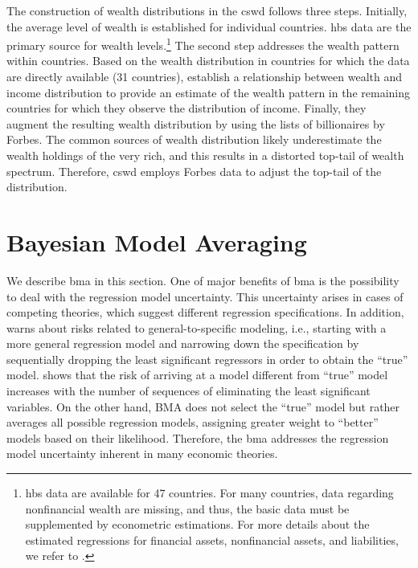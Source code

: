 \documentclass[a4paper,11pt]{article}
\begin{document}
The construction of wealth distributions in the \ac{cswd} follows three steps. Initially, the average level of wealth is established for individual countries. \ac{hbs} data are the primary source for wealth levels.\footnote{\ac{hbs} data are available for 47 countries. For many countries, data regarding nonfinancial wealth are missing, and thus, the basic data must be supplemented by econometric estimations. For more details about the estimated regressions for financial assets, nonfinancial assets, and liabilities, we refer to \citet{daviesetal2017}.} The second step addresses the wealth pattern within countries. Based on the wealth distribution in countries for which the data are directly available (31 countries), \citet{daviesetal2017} establish a relationship between wealth and income distribution to provide an estimate of the wealth pattern in the remaining countries for which they observe the distribution of income. Finally, they augment the resulting wealth distribution by using the lists of billionaires by Forbes. The common sources of wealth distribution likely underestimate the wealth holdings of the very rich, and this results in a distorted top-tail of wealth spectrum. Therefore, \ac{cswd} employs Forbes data to adjust the top-tail of the distribution. 

\section{Bayesian Model Averaging}
\label{sec:BMA}
We describe \ac{bma} in this section. %
One of major benefits of \ac{bma} is the possibility to deal with the regression model uncertainty. This uncertainty arises in cases of competing theories, which suggest different regression specifications. In addition, \citet{Koop2003} warns about risks related to general-to-specific modeling, i.e., starting with a more general regression model and narrowing down the specification by sequentially dropping the least significant regressors in order to obtain the ``true'' model. \citet{Koop2003} shows that the risk of arriving at a model different from ``true'' model increases with the number of sequences of eliminating the least significant variables. On the other hand, BMA does not select the ``true'' model but rather averages all possible regression models, assigning greater weight to ``better'' models based on their likelihood. Therefore, the \ac{bma} addresses the regression model uncertainty inherent in many economic theories. 
\end{document}
